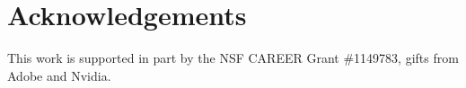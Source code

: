 \documentclass[10pt,twocolumn,letterpaper]{article}
\begin{document}
\section{Acknowledgements}
\vspace{-1mm}
This work is supported in part by the NSF CAREER Grant \#1149783, gifts from Adobe and Nvidia.

\small


\end{document}
